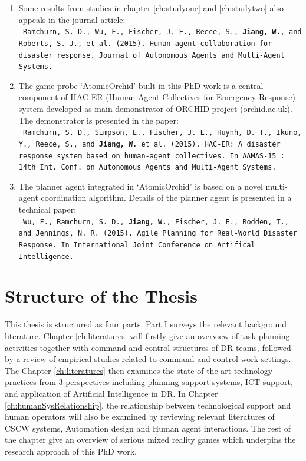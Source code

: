 \begin{enumerate}
\item Some results from studies in chapter \ref{ch:studyone} and \ref{ch:studytwo} also appeals in the journal article:\\
\texttt{ \footnotesize Ramchurn, S. D., Wu, F., Fischer, J. E., Reece, S., \textbf{Jiang, W.}, and Roberts, S. J., et al. (2015). Human-agent collaboration for disaster response. Journal of Autonomous Agents and Multi-Agent Systems.}\\

\item The game probe `AtomicOrchid' built in this PhD work is a central component of HAC-ER (Human Agent Collectives for Emergency Response) system  developed as main demonstrator of ORCHID project (orchid.ac.uk). The demonstrator is presented in the paper:\\
\texttt{ \footnotesize Ramchurn, S. D., Simpson, E., Fischer, J. E., Huynh, D. T., Ikuno, Y., Reece, S., and \textbf{ Jiang, W.} et al. (2015). HAC-ER: A disaster response system based on human-agent collectives. In AAMAS-15 : 14th Int. Conf. on Autonomous Agents and Multi-Agent Systems.} \\ 

\item The planner agent integrated in `AtomicOrchid' is based on a novel multi-agent coordination algorithm. Details of the planner agent is presented in a technical paper:\\
 \texttt{ \footnotesize Wu, F., Ramchurn, S. D., \textbf{Jiang, W.}, Fischer, J. E., Rodden, T., and Jennings, N. R. (2015). Agile Planning for Real-World Disaster Response. In International Joint Conference on Artifical Intelligence.}

\end{enumerate} 

\section{Structure of the Thesis}
This thesis is structured as four parts. Part I surveys the relevant background literature. Chapter \ref{ch:literatures} will firstly give an overview of task planning activities together with command and control structures of \ac{DR} teams, followed by a review of empirical studies related to command and control work settings. The Chapter \ref{ch:literatures} then examines the state-of-the-art technology practices from 3 perspectives including planning support systems, \ac{ICT} support, and application of Artificial Intelligence in \ac{DR}. In Chapter \ref{ch:humanSysRelationship}, the relationship between technological support and human operators will also be examined by reviewing relevant literatures of \ac{CSCW} systems, Automation design and Human agent interactions. The rest of the chapter give an overview of serious mixed reality games which underpins the research approach of this PhD work.\\

